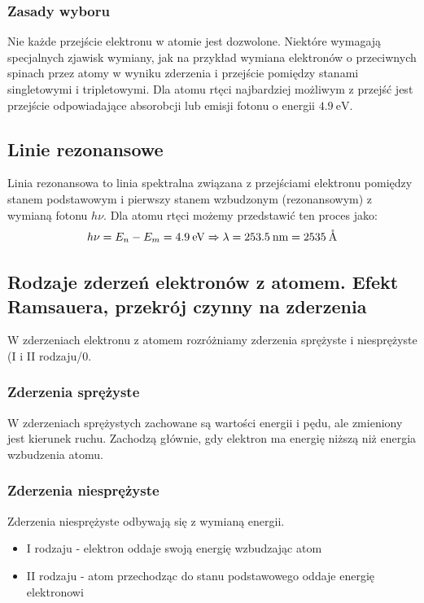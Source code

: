 \documentclass[paper=a4, fontsize=12pt]{scrartcl}
\begin{document}
\subsubsection{Zasady wyboru}	
Nie każde przejście elektronu w atomie jest dozwolone. Niektóre wymagają specjalnych zjawisk wymiany, jak na przykład wymiana elektronów o przeciwnych spinach przez atomy w wyniku zderzenia i przejście pomiędzy stanami singletowymi i tripletowymi. Dla atomu rtęci najbardziej możliwym z przejść jest przejście odpowiadające absorobcji lub emisji fotonu o energii $4.9\:\mathrm{eV}$.
\subsection{Linie rezonansowe}
Linia rezonansowa to linia spektralna związana z przejściami elektronu pomiędzy stanem podstawowym i pierwszy stanem wzbudzonym (rezonansowym) z wymianą fotonu $h\nu$. Dla atomu rtęci możemy przedstawić ten proces jako:
		\begin{equation*}
		h\nu=E_n - E_m = 4.9\:\rm{eV}\Rightarrow \lambda =253.5\:\mathrm{nm}= 2535 \:\mathring{\mathrm{A}}
		\end{equation*}
\subsection{Rodzaje zderzeń elektronów z atomem. Efekt Ramsauera, przekrój czynny na zderzenia}	
		
		W zderzeniach elektronu z atomem rozróżniamy zderzenia sprężyste i niesprężyste (I i II rodzaju/0.
\subsubsection{Zderzenia sprężyste}
W zderzeniach sprężystych zachowane są wartości energii i pędu, ale zmieniony jest kierunek ruchu. Zachodzą głównie, gdy elektron ma energię niższą niż energia wzbudzenia atomu.
\subsubsection{Zderzenia niesprężyste}
Zderzenia niesprężyste odbywają się z wymianą energii.
\begin{itemize}
	\item I rodzaju - elektron oddaje swoją energię wzbudzając atom
	\item II rodzaju - atom przechodząc do stanu podstawowego oddaje energię elektronowi
\end{itemize}
		
\end{document}
